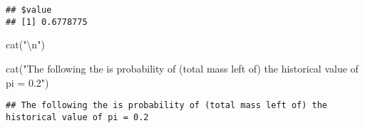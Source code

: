 \documentclass[
]{article}
\newenvironment{Shaded}{\begin{snugshade}}{\end{snugshade}}
\newcommand{\FunctionTok}[1]{\textcolor[rgb]{0.00,0.00,0.00}{#1}}
\newcommand{\NormalTok}[1]{#1}
\newcommand{\SpecialCharTok}[1]{\textcolor[rgb]{0.00,0.00,0.00}{#1}}
\newcommand{\StringTok}[1]{\textcolor[rgb]{0.31,0.60,0.02}{#1}}
\begin{document}
\begin{verbatim}
## $value
## [1] 0.6778775
\end{verbatim}

\begin{Shaded}
\begin{Highlighting}[]
\FunctionTok{cat}\NormalTok{(}\StringTok{"}\SpecialCharTok{\textbackslash{}n}\StringTok{"}\NormalTok{)}
\end{Highlighting}
\end{Shaded}

\begin{Shaded}
\begin{Highlighting}[]
\FunctionTok{cat}\NormalTok{(}\StringTok{"The following the is probability of (total mass left of) the historical value of pi = 0.2"}\NormalTok{)}
\end{Highlighting}
\end{Shaded}

\begin{verbatim}
## The following the is probability of (total mass left of) the historical value of pi = 0.2
\end{verbatim}
\end{document}
